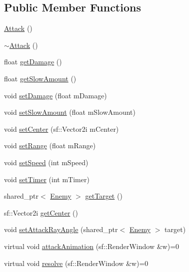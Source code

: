 \subsection*{Public Member Functions}
\begin{DoxyCompactItemize}
\item 
\hyperlink{class_attack_aa2f391755dbfa049a6bc2991fae80017}{Attack} ()
\item 
\hyperlink{class_attack_a6d3c8266507e4ac0102ab40847f478fe}{$\sim$\+Attack} ()
\item 
float \hyperlink{class_attack_a03f55a2222756b756522c90de785a254}{get\+Damage} ()
\item 
float \hyperlink{class_attack_ae6eb96b3cd44a8c90e88d09de05224f3}{get\+Slow\+Amount} ()
\item 
void \hyperlink{class_attack_a1cd547335be67bf657f65d43ebc5f944}{set\+Damage} (float m\+Damage)
\item 
void \hyperlink{class_attack_a75d9cd8b8e20236cbd2c81dd7ede76a1}{set\+Slow\+Amount} (float m\+Slow\+Amount)
\item 
void \hyperlink{class_attack_a4fc62d7217e5e23232ee97f67a22becd}{set\+Center} (sf\+::\+Vector2i m\+Center)
\item 
void \hyperlink{class_attack_af5eaeef073b1cabb2baaa7a32489afa4}{set\+Range} (float m\+Range)
\item 
void \hyperlink{class_attack_a6800223da82f1ccf295b9d0a1940cb9e}{set\+Speed} (int m\+Speed)
\item 
void \hyperlink{class_attack_a096521777c0ac31ee453d42ab2bdc8aa}{set\+Timer} (int m\+Timer)
\item 
shared\+\_\+ptr$<$ \hyperlink{class_enemy}{Enemy} $>$ \hyperlink{class_attack_a2181ac078d36264732cd16cb3b80efee}{get\+Target} ()
\item 
sf\+::\+Vector2i \hyperlink{class_attack_a03bd157da34103a2a3a79fcd53e65e12}{get\+Center} ()
\item 
void \hyperlink{class_attack_ab6ca4fe8a0516671230a225af069e3d2}{set\+Attack\+Ray\+Angle} (shared\+\_\+ptr$<$ \hyperlink{class_enemy}{Enemy} $>$ target)
\item 
virtual void \hyperlink{class_attack_a893c5523d0c10531a99e0c84caf87ef6}{attack\+Animation} (sf\+::\+Render\+Window \&w)=0
\item 
virtual void \hyperlink{class_attack_aa3cd911d37e61278a9eeeb6d60303102}{resolve} (sf\+::\+Render\+Window \&w)=0
\end{DoxyCompactItemize}
